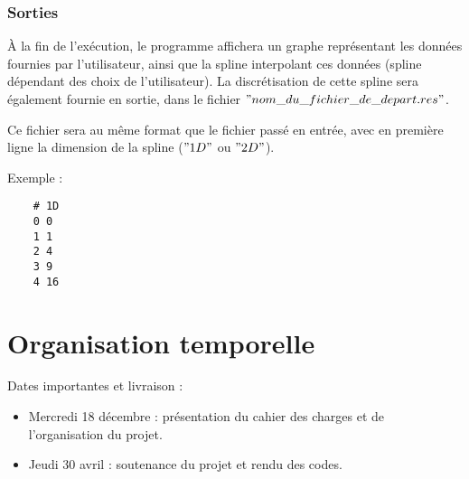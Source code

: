 \documentclass[a4paper,12pt]{article}
\begin{document}
\subsubsection{Sorties}

À la fin de l'exécution, le programme affichera un graphe représentant les données fournies par l'utilisateur, ainsi que la spline interpolant ces données (spline dépendant des choix de l'utilisateur). La discrétisation de cette spline sera également fournie en sortie, dans le fichier $"nom\_du\_fichier\_de\_depart.res"$.

Ce fichier sera au même format que le fichier passé en entrée, avec en première ligne la dimension de la spline ($"1D" $ ou $"2D"$).

Exemple : 

\begin{lstlisting}
    # 1D
    0 0
    1 1
    2 4
    3 9
    4 16
\end{lstlisting}

\section{Organisation temporelle}

Dates importantes et livraison :
\begin{itemize}
\item Mercredi 18 décembre : présentation du cahier des charges et de l'organisation du projet.
\item Jeudi 30 avril : soutenance du projet et rendu des codes.
\end{itemize}
\end{document}
